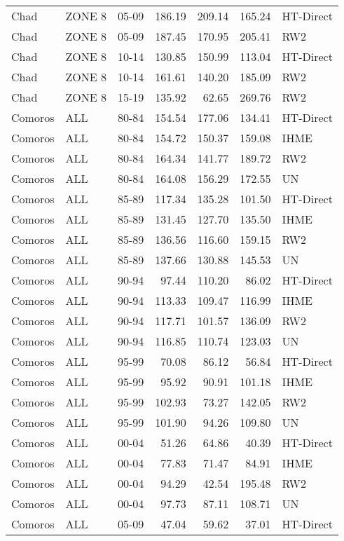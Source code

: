 \begin{longtable}{lllrrrl}
  Chad & ZONE 8 & 05-09 & 186.19 & 209.14 & 165.24 & HT-Direct \\ 
  Chad & ZONE 8 & 05-09 & 187.45 & 170.95 & 205.41 & RW2 \\ 
  Chad & ZONE 8 & 10-14 & 130.85 & 150.99 & 113.04 & HT-Direct \\ 
  Chad & ZONE 8 & 10-14 & 161.61 & 140.20 & 185.09 & RW2 \\ 
  Chad & ZONE 8 & 15-19 & 135.92 & 62.65 & 269.76 & RW2 \\ 
  Comoros & ALL & 80-84 & 154.54 & 177.06 & 134.41 & HT-Direct \\ 
  Comoros & ALL & 80-84 & 154.72 & 150.37 & 159.08 & IHME \\ 
  Comoros & ALL & 80-84 & 164.34 & 141.77 & 189.72 & RW2 \\ 
  Comoros & ALL & 80-84 & 164.08 & 156.29 & 172.55 & UN \\ 
  Comoros & ALL & 85-89 & 117.34 & 135.28 & 101.50 & HT-Direct \\ 
  Comoros & ALL & 85-89 & 131.45 & 127.70 & 135.50 & IHME \\ 
  Comoros & ALL & 85-89 & 136.56 & 116.60 & 159.15 & RW2 \\ 
  Comoros & ALL & 85-89 & 137.66 & 130.88 & 145.53 & UN \\ 
  Comoros & ALL & 90-94 & 97.44 & 110.20 & 86.02 & HT-Direct \\ 
  Comoros & ALL & 90-94 & 113.33 & 109.47 & 116.99 & IHME \\ 
  Comoros & ALL & 90-94 & 117.71 & 101.57 & 136.09 & RW2 \\ 
  Comoros & ALL & 90-94 & 116.85 & 110.74 & 123.03 & UN \\ 
  Comoros & ALL & 95-99 & 70.08 & 86.12 & 56.84 & HT-Direct \\ 
  Comoros & ALL & 95-99 & 95.92 & 90.91 & 101.18 & IHME \\ 
  Comoros & ALL & 95-99 & 102.93 & 73.27 & 142.05 & RW2 \\ 
  Comoros & ALL & 95-99 & 101.90 & 94.26 & 109.80 & UN \\ 
  Comoros & ALL & 00-04 & 51.26 & 64.86 & 40.39 & HT-Direct \\ 
  Comoros & ALL & 00-04 & 77.83 & 71.47 & 84.91 & IHME \\ 
  Comoros & ALL & 00-04 & 94.29 & 42.54 & 195.48 & RW2 \\ 
  Comoros & ALL & 00-04 & 97.73 & 87.11 & 108.71 & UN \\ 
  Comoros & ALL & 05-09 & 47.04 & 59.62 & 37.01 & HT-Direct \\ 

\end{longtable}
